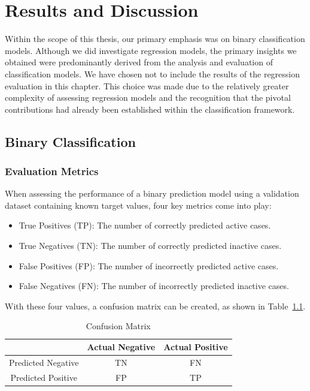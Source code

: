 \chapter{Results and Discussion}\label{chap:results_discussion}

Within the scope of this thesis, our primary emphasis was on binary classification models. Although we did investigate regression models, the primary insights we obtained were predominantly derived from the analysis and evaluation of classification models. We have chosen not to include the results of the regression evaluation in this chapter. This choice was made due to the relatively greater complexity of assessing regression models and the recognition that the pivotal contributions had already been established within the classification framework.

\section{Binary Classification}
\subsection{Evaluation Metrics}
When assessing the performance of a binary prediction model using a validation dataset containing known target values, four key metrics come into play:

\begin{itemize}
  \item True Positives (TP): The number of correctly predicted active cases.
  \item True Negatives (TN): The number of correctly predicted inactive cases.
  \item False Positives (FP): The number of incorrectly predicted active cases.
  \item False Negatives (FN): The number of incorrectly predicted inactive cases.
\end{itemize}

With these four values, a confusion matrix can be created, as shown in Table~\ref{tab:confusion_matrix}.

\begin{table}[h]
  \centering
  \caption{Confusion Matrix}
  \label{tab:confusion_matrix}
  \setlength{\tabcolsep}{10pt} %
  \renewcommand{\arraystretch}{1.5} %
  \begin{tabular}{|c|c|c|}
  \cline{2-3}
  \multicolumn{1}{c|}{} & Actual Negative & Actual Positive \\
  \hline
  Predicted Negative & TN & FN \\
  \hline
  Predicted Positive & FP & TP \\
  \hline
  \end{tabular}
\end{table}

